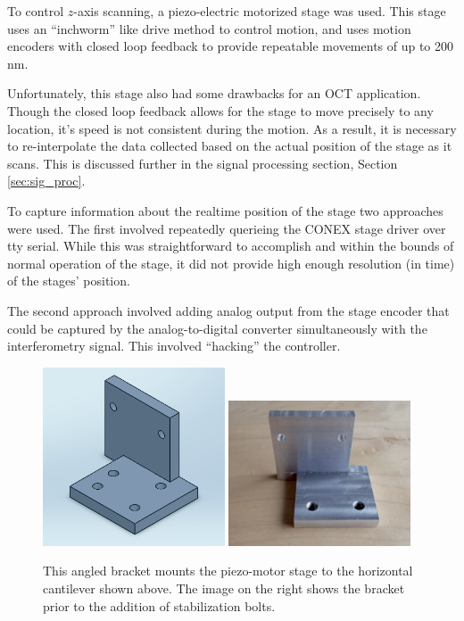 To control $z$-axis scanning, a piezo-electric motorized stage was used. This stage uses an ``inchworm'' like drive method to control motion, and uses motion encoders with closed loop feedback to provide repeatable movements of up to 200 nm.

Unfortunately, this stage also had some drawbacks for an OCT application. Though the closed loop feedback allows for the stage to move precisely to any location, it's speed is not consistent during the motion. As a result, it is necessary to re-interpolate the data collected based on the actual position of the stage as it scans. This is discussed further in the signal processing section, Section \ref{sec:sig_proc}.

To capture information about the realtime position of the stage two approaches were used. The first involved repeatedly querieing the CONEX stage driver over tty serial. While this was straightforward to accomplish and within the bounds of normal operation of the stage, it did not provide high enough resolution (in time) of the stages' position.

The second approach involved adding analog output from the stage encoder that could be captured by the analog-to-digital converter simultaneously with the interferometry signal. This involved ``hacking'' %
the controller.

\begin{figure}[h!]
\centering
\includegraphics[width=0.48\textwidth]{Images/Alignment/angle_bracket2.png}
\includegraphics[width=0.48\textwidth]{Images/Alignment/angle_bracket.jpg}
\caption{This angled bracket mounts the piezo-motor stage to the horizontal cantilever shown above. The image on the right shows the bracket prior to the addition of stabilization bolts.}
\end{figure}

